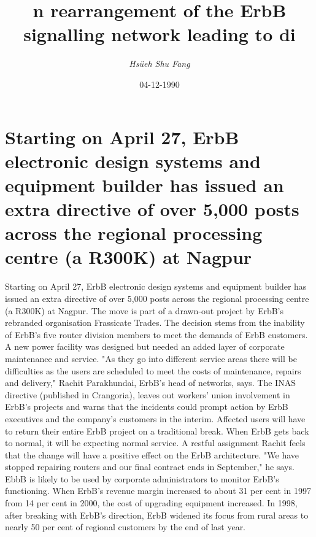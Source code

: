 \documentclass{article}%
\title{n rearrangement of the ErbB signalling network leading to di}%
\author{\textit{Hsüeh Shu Fang}}%
\date{04-12-1990}%
\begin{document}
%
\normalsize%
\maketitle%
\section{Starting on April 27, ErbB electronic design systems and equipment builder has issued an extra directive of over 5,000 posts across the regional processing centre (a R300K) at Nagpur}%
\label{sec:StartingonApril27,ErbBelectronicdesignsystemsandequipmentbuilderhasissuedanextradirectiveofover5,000postsacrosstheregionalprocessingcentre(aR300K)atNagpur}%
Starting on April 27, ErbB electronic design systems and equipment builder has issued an extra directive of over 5,000 posts across the regional processing centre (a R300K) at Nagpur.\newline%
The move is part of a drawn{-}out project by ErbB's rebranded organisation Frassicate Trades. The decision stems from the inability of ErbB's five router division members to meet the demands of ErbB customers. A new power facility was designed but needed an added layer of corporate maintenance and service.\newline%
"As they go into different service areas there will be difficulties as the users are scheduled to meet the costs of maintenance, repairs and delivery," Rachit Parakhundai, ErbB's head of networks, says.\newline%
The INAS directive (published in Crangoria), leaves out workers' union involvement in ErbB's projects and warns that the incidents could prompt action by ErbB executives and the company's customers in the interim.\newline%
Affected users will have to return their entire ErbB project on a traditional break. When ErbB gets back to normal, it will be expecting normal service.\newline%
A restful assignment\newline%
Rachit feels that the change will have a positive effect on the ErbB architecture. "We have stopped repairing routers and our final contract ends in September," he says.\newline%
EbbB is likely to be used by corporate administrators to monitor ErbB's functioning. When ErbB's revenue margin increased to about 31 per cent in 1997 from 14 per cent in 2000, the cost of upgrading equipment increased. In 1998, after breaking with ErbB's direction, ErbB widened its focus from rural areas to nearly 50 per cent of regional customers by the end of last year.\newline%
\end{document}
